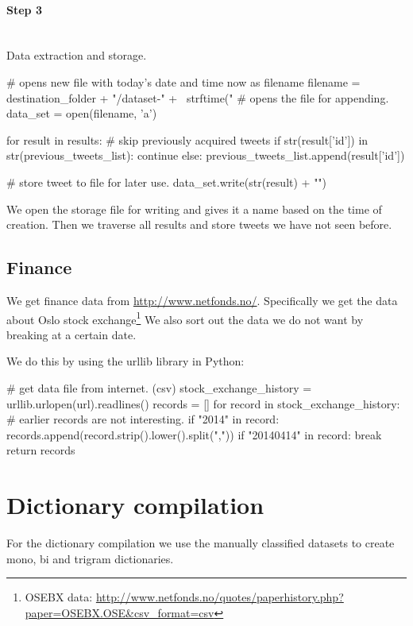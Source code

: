 \paragraph{Step 3}
\hspace{0pt}\\
Data extraction and storage.
\begin{python}
# opens new file with today's date and time now as filename
filename = destination_folder + "/dataset-" + \
    strftime("%
# opens the file for appending.
data_set = open(filename, 'a')

for result in results:
    # skip previously acquired tweets
    if str(result['id']) in str(previous_tweets_list):
        continue
    else:
        previous_tweets_list.append(result['id'])
    
    # store tweet to file for later use.
    data_set.write(str(result) + "\n")
\end{python}

We open the storage file for writing and gives it a name based on the time of
creation. Then we traverse all results and store tweets we have not seen
before. 

\subsection{Finance}
We get finance data from \url{http://www.netfonds.no/}. Specifically we get the
data about Oslo stock exchange\footnote{OSEBX data:
\url{http://www.netfonds.no/quotes/paperhistory.php?paper=OSEBX.OSE&csv_format=csv}}
We also sort out the data we do not want by breaking at a certain date. 

We do this by using the urllib library in Python: 
\begin{python}
# get data file from internet. (csv)
stock_exchange_history = urllib.urlopen(url).readlines()
records = []
for record in stock_exchange_history:
    # earlier records are not interesting.
    if "2014" in record:
        records.append(record.strip().lower().split(","))
    if "20140414" in record:
        break
return records
\end{python}
%

\section{Dictionary compilation}\label{code:dictionary_compilation}
For the dictionary compilation we use the manually classified datasets to
create mono, bi and trigram dictionaries. 

